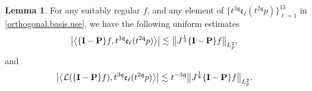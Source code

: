 \documentclass[reqno]{amsart}
\newcommand{\pv}{p}
\def\norm#1{\big\Vert#1\big\Vert}
\newcommand{\qq}{\mathfrak{q}}
\newcommand{\tqq}{t^{2\qq}}
\newcommand{\tTq}{t^{3\qq}}
\newcommand{\tmTq}{t^{-3\qq}}
\newcommand{\linL}{\mathcal{L}}
\newcommand{\micro}{{\bf \{I- P\}}}
\theoremstyle{definition}
\newtheorem{lemma}[theorem]{Lemma}
\numberwithin{equation}{section}
\numberwithin{theorem}{section}
\begin{document}
\begin{lemma}
	\label{L8.6} For any suitably regular \(f\), and any element of $\{\tTq \mathfrak{e}_{\ell}(\tqq \pv)\}_{\ell=1}^{13}$ in \eqref{orthogonal.basis.use},  we have the following uniform estimates
\begin{align}\label{dispersion.term.basis.est}
   \left| \left\langle \micro  f, \tTq \mathfrak{e}_{\ell}(\tqq \pv)\right\rangle \right|
        \lesssim &~   \norm{J^{\frac{1}{4}} \micro   f}_{L^2_{\pv}},
\end{align}
and
    \begin{align}\label{lin.basis.est}
   \left| \left\langle \linL( \micro  f), \tTq \mathfrak{e}_{\ell}(\tqq \pv)\right\rangle \right|
        \lesssim &~ \tmTq \norm{J^{\frac{1}{8}} \micro  f}_{L^2_{\pv}}.
\end{align}
\end{lemma}
\end{document}
